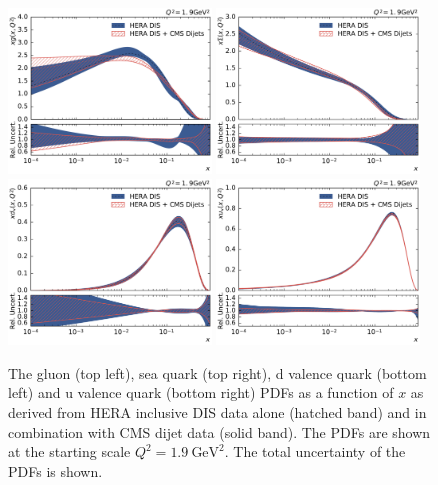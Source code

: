 \begin{figure}[tbp]
  \centering
  \includegraphics[width=0.48\textwidth]{figures/pdf_constraints/pdfcomp_direct_0_1.9.pdf}\hfill%
  \includegraphics[width=0.48\textwidth]{figures/pdf_constraints/pdfcomp_direct_9_1.9.pdf}
  \includegraphics[width=0.48\textwidth]{figures/pdf_constraints/pdfcomp_direct_7_1.9.pdf}\hfill%
  \includegraphics[width=0.48\textwidth]{figures/pdf_constraints/pdfcomp_direct_8_1.9.pdf}
  \caption[Direct comparison of gluon and quark PDFs]{The gluon (top left), sea
  quark (top right), d valence quark (bottom left) and u valence quark (bottom
right) PDFs as a function of $x$ as derived from HERA inclusive DIS data
alone (hatched band) and in combination with CMS dijet data (solid band). The PDFs
are shown at the starting scale $Q^2 = \SI{1.9}{\GeV \squared}$. The total
uncertainty of the PDFs is shown.}
  \label{fig:pdfconstraints:direct:19}
\end{figure}


